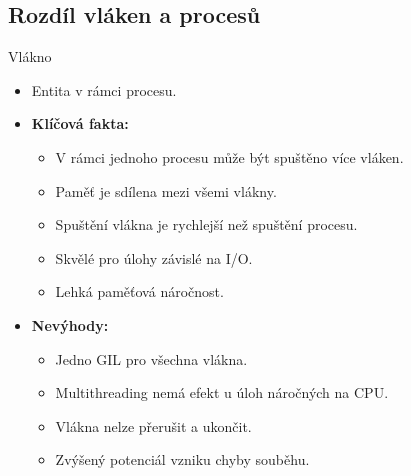 \documentclass{beamer}
\begin{document}
\subsection{Rozdíl vláken a procesů}
\begin{frame}{Vlákno}
	\begin{itemize}
		\item Entita v rámci procesu.
		\item \textbf{Klíčová fakta:}
			\begin{itemize}
				\item [\textendash] V rámci jednoho procesu může být spuštěno více vláken.
				\item [\textendash] Paměť je sdílena mezi všemi vlákny.
				\item [\textendash] Spuštění vlákna je rychlejší než spuštění procesu.
				\item [\textendash] Skvělé pro úlohy závislé na I/O.
				\item [\textendash] Lehká paměťová náročnost.
			\end{itemize}
		\item \textbf{Nevýhody:}
			\begin{itemize}
				\item [\textendash] Jedno GIL pro všechna vlákna.
				\item [\textendash] Multithreading nemá efekt u úloh náročných na CPU.
				\item [\textendash] Vlákna nelze přerušit a ukončit.
				\item [\textendash] Zvýšený potenciál vzniku chyby souběhu.
			\end{itemize}
	\end{itemize}
\end{frame}
\end{document}
